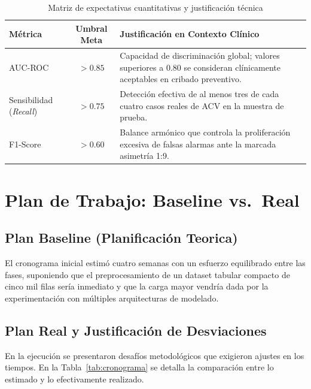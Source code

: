 \documentclass[12pt,a4paper]{article}
\begin{document}
\begin{table}[H]
\centering
\small
\caption{Matriz de expectativas cuantitativas y justificación técnica}
\label{tab:expectativas}
\begin{tabularx}{\textwidth}{@{}l c L@{}}
\toprule
\textbf{Métrica} & \textbf{Umbral Meta} & \textbf{Justificación en Contexto Clínico} \\
\midrule
AUC-ROC & $> 0.85$ & Capacidad de discriminación global; valores superiores a $0.80$ se consideran clínicamente aceptables en cribado preventivo. \\
Sensibilidad (\textit{Recall}) & $> 0.75$ & Detección efectiva de al menos tres de cada cuatro casos reales de ACV en la muestra de prueba. \\
F1-Score & $> 0.60$ & Balance armónico que controla la proliferación excesiva de falsas alarmas ante la marcada asimetría 1:9. \\
\bottomrule
\end{tabularx}
\end{table}

\section{Plan de Trabajo: Baseline vs.\ Real}

\subsection{Plan Baseline (Planificación Teorica)}
El cronograma inicial estimó cuatro semanas con un esfuerzo equilibrado entre las fases, suponiendo que el preprocesamiento de un dataset tabular compacto de cinco mil filas sería inmediato y que la carga mayor vendría dada por la experimentación con múltiples arquitecturas de modelado.

\subsection{Plan Real y Justificación de Desviaciones}
En la ejecución se presentaron desafíos metodológicos que exigieron ajustes en los tiempos. En la Tabla~\ref{tab:cronograma} se detalla la comparación entre lo estimado y lo efectivamente realizado.
\end{document}
